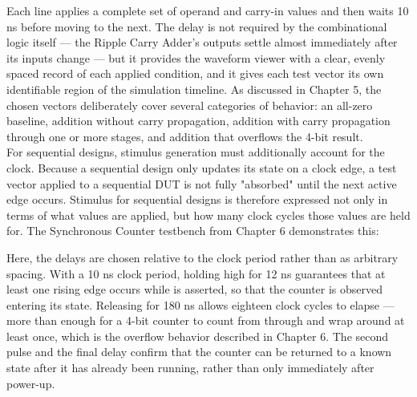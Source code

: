 
Each line applies a complete set of operand and carry-in values and then waits 10 ns before moving to the next. The delay is not required by the combinational logic itself — the Ripple Carry Adder's outputs settle almost immediately after its inputs change — but it provides the waveform viewer with a clear, evenly spaced record of each applied condition, and it gives each test vector its own identifiable region of the simulation timeline. As discussed in Chapter 5, the chosen vectors deliberately cover several categories of behavior: an all-zero baseline, addition without carry propagation, addition with carry propagation through one or more stages, and addition that overflows the 4-bit result.\\


\noindent For sequential designs, stimulus generation must additionally account for the clock. Because a sequential design only updates its state on a clock edge, a test vector applied to a sequential DUT is not fully "absorbed" until the next active edge occurs. Stimulus for sequential designs is therefore expressed not only in terms of what values are applied, but how many clock cycles those values are held for. The Synchronous Counter testbench from Chapter 6 demonstrates this:


Here, the delays are chosen relative to the clock period rather than as arbitrary spacing. With a 10 ns clock period, holding  high for 12 ns guarantees that at least one rising edge occurs while  is asserted, so that the counter is observed entering its  state. Releasing  for 180 ns allows eighteen clock cycles to elapse — more than enough for a 4-bit counter to count from through  and wrap around at least once, which is the overflow behavior described in Chapter 6. The second  pulse and the final delay confirm that the counter can be returned to a known state after it has already been running, rather than only immediately after power-up.\\

